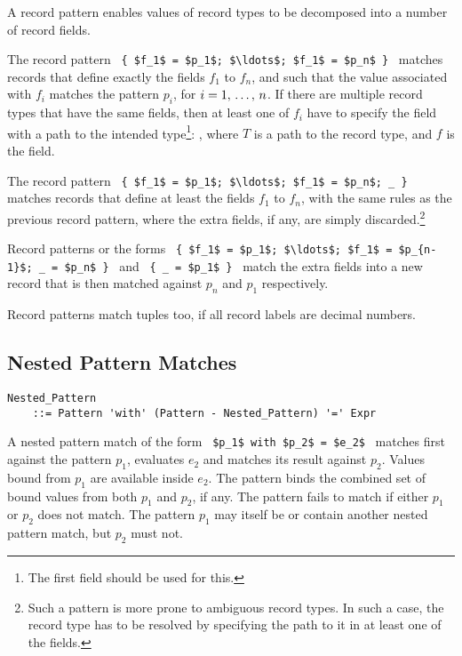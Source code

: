 A record pattern enables values of record types to be decomposed into a number of record fields. 

The record pattern ~\lstinline!{ $f_1$ = $p_1$; $\ldots$; $f_1$ = $p_n$ }!~ matches records that define exactly the fields $f_1$ to $f_n$, and such that the value associated with $f_i$ matches the pattern $p_i$, for $i = 1 ,\, \ldots ,\, n$. If there are multiple record types that have the same fields, then at least one of $f_i$ have to specify the field with a path to the intended type\footnote{The first field should be used for this.}: , where $T$ is a path to the record type, and $f$ is the field. 

The record pattern ~\lstinline!{ $f_1$ = $p_1$; $\ldots$; $f_1$ = $p_n$; _ }!~ matches records that define at least the fields $f_1$ to $f_n$, with the same rules as the previous record pattern, where the extra fields, if any, are simply discarded.\footnote{Such a pattern is more prone to ambiguous record types. In such a case, the record type has to be resolved by specifying the path to it in at least one of the fields.}

Record patterns or the forms ~\lstinline!{ $f_1$ = $p_1$; $\ldots$; $f_1$ = $p_{n-1}$; _ = $p_n$ }!~ and ~\lstinline!{ _ = $p_1$ }!~ match the extra fields into a new record that is then matched against $p_n$ and $p_1$ respectively. 

Record patterns match tuples too, if all record labels are decimal numbers. 





\subsection{Nested Pattern Matches}
\label{sec:nested-pattern-matches}

\grammar\begin{lstlisting}
Nested_Pattern 
    ::= Pattern 'with' (Pattern - Nested_Pattern) '=' Expr
\end{lstlisting}

A nested pattern match of the form ~\lstinline!$p_1$ with $p_2$ = $e_2$!~ matches first against the pattern $p_1$, evaluates $e_2$ and matches its result against $p_2$. Values bound from $p_1$ are available inside $e_2$. The pattern binds the combined set of bound values from both $p_1$ and $p_2$, if any. The pattern fails to match if either $p_1$ or $p_2$ does not match. The pattern $p_1$ may itself be or contain another nested pattern match, but $p_2$ must not. 

